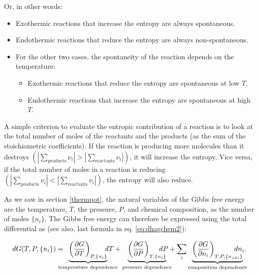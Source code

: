 \documentclass[
  9pt,
]{extbook}
\providecommand{\tightlist}{%
  \setlength{\itemsep}{0pt}\setlength{\parskip}{0pt}}
\theoremstyle{definition}
\theoremstyle{definition}
\theoremstyle{definition}
\theoremstyle{definition}
\theoremstyle{remark}
\begin{document}
Or, in other words:

\begin{itemize}
\tightlist
\item
  Exothermic reactions that increase the entropy are always spontaneous.
\item
  Endothermic reactions that reduce the entropy are always non-spontaneous.
\item
  For the other two cases, the spontaneity of the reaction depends on the temperature:

  \begin{itemize}
  \tightlist
  \item
    Exothermic reactions that reduce the entropy are spontaneous at low \(T\).
  \item
    Endothermic reactions that increase the entropy are spontaneous at high \(T\).
  \end{itemize}
\end{itemize}

A simple criterion to evaluate the entropic contribution of a reaction is to look at the total number of moles of the reactants and the products (as the sum of the stoichiometric coefficients). If the reaction is producing more molecules than it destroys \(\left( \left| \sum_\text{products} \nu_i \right| > \left| \sum_\text{reactants} \nu_i \right| \right)\), it will increase the entropy. Vice versa, if the total number of moles in a reaction is reducing \(\left( \left| \sum_\text{products} \nu_i \right| < \left| \sum_\text{reactants} \nu_i \right| \right)\), the entropy will also reduce.

As we saw in section \ref{thermpot}, the natural variables of the Gibbs free energy are the temperature, \(T\), the pressure, \(P\), and chemical composition, as the number of moles \(\{n_i\}\). The Gibbs free energy can therefore be expressed using the total differential as (see also, last formula in eq. \eqref{eq:dhagchem2}):

\begin{equation}
dG(T,P,\{n_i\}) = \mkern-18mu \underbrace{\left(\frac{\partial G}{\partial T} \right)_{P,\{n_i\}}}_{\text{temperature dependence}} \mkern-36mu dT + \underbrace{\left(\frac{\partial G}{\partial P} \right)_{T,\{n_i\}}}_{\text{pressure dependence}} \mkern-36mu dP + \sum_i \underbrace{\left(\frac{\partial G}{\partial n_i} \right)_{T,P,\{n_{j \neq i}\}}}_{\text{composition dependence}} \mkern-36mu dn_i.
\label{eq:dgtotdiff}
\end{equation}
\end{document}
